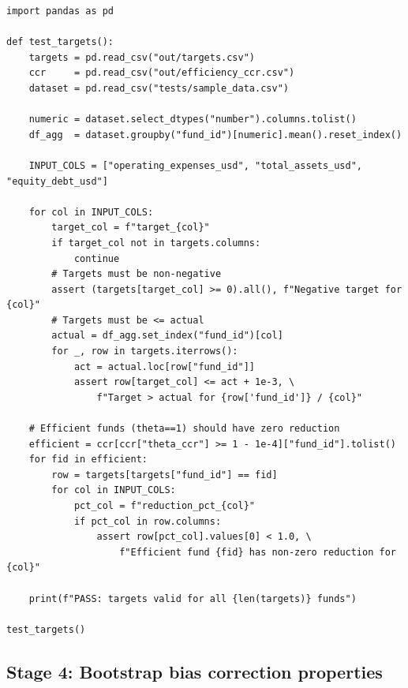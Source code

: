 \documentclass[12pt,a4paper]{article}
\begin{document}
\begin{lstlisting}[style=python, caption={Test: target inputs are non-negative and <= actual inputs}]
import pandas as pd

def test_targets():
    targets = pd.read_csv("out/targets.csv")
    ccr     = pd.read_csv("out/efficiency_ccr.csv")
    dataset = pd.read_csv("tests/sample_data.csv")

    numeric = dataset.select_dtypes("number").columns.tolist()
    df_agg  = dataset.groupby("fund_id")[numeric].mean().reset_index()

    INPUT_COLS = ["operating_expenses_usd", "total_assets_usd", "equity_debt_usd"]

    for col in INPUT_COLS:
        target_col = f"target_{col}"
        if target_col not in targets.columns:
            continue
        # Targets must be non-negative
        assert (targets[target_col] >= 0).all(), f"Negative target for {col}"
        # Targets must be <= actual
        actual = df_agg.set_index("fund_id")[col]
        for _, row in targets.iterrows():
            act = actual.loc[row["fund_id"]]
            assert row[target_col] <= act + 1e-3, \
                f"Target > actual for {row['fund_id']} / {col}"

    # Efficient funds (theta==1) should have zero reduction
    efficient = ccr[ccr["theta_ccr"] >= 1 - 1e-4]["fund_id"].tolist()
    for fid in efficient:
        row = targets[targets["fund_id"] == fid]
        for col in INPUT_COLS:
            pct_col = f"reduction_pct_{col}"
            if pct_col in row.columns:
                assert row[pct_col].values[0] < 1.0, \
                    f"Efficient fund {fid} has non-zero reduction for {col}"

    print(f"PASS: targets valid for all {len(targets)} funds")

test_targets()
\end{lstlisting}

\subsection{Stage 4: Bootstrap bias correction properties}
\end{document}
